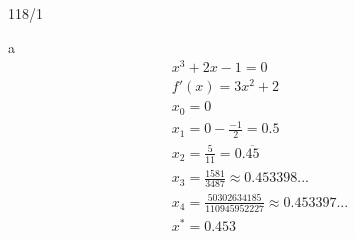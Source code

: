 \begin{onepage}
  \begin{exercise}{118/1}
    \item [a]
    \begin{gather*}
      x^3 + 2x - 1 = 0 \\
      f'(x) = 3x^2 + 2 \\
      x_0 = 0 \\
      x_1 = 0 - \frac{-1}{2} = 0.5 \\
      x_2 = \frac{5}{11} = 0.\overline{45} \\
      x_3 = \frac{1581}{3487} \approx 0.453398... \\
      x_4 = \frac{50302634185}{110945952227} \approx 0.453397...\\
      x^\ast = 0.453
    \end{gather*}
  \end{exercise}
\end{onepage}
